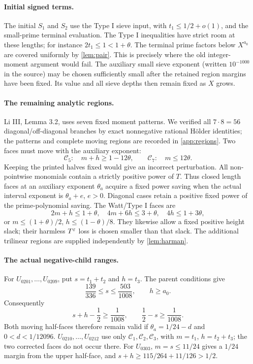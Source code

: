 \paragraph{Initial signed terms.}
The initial $S_1$ and $S_2$ use the Type I sieve input, with
$t_1\le1/2+o(1)$, and the small-prime terminal evaluation.
The Type I inequalities have strict room at these lengths;
for instance $2t_1\le1<1+\theta$.
The terminal prime factors below $X^{a_0}$ are covered uniformly by
\cref{lem:pair}. This is precisely where the old integer-moment
argument would fail. The auxiliary small sieve exponent (written
$10^{-1000}$ in the source) may be chosen sufficiently small after
the retained region margins have been fixed. Its value and all
sieve depths then remain fixed as $X$ grows.

\paragraph{The remaining analytic regions.}
Li III, Lemma 3.2, uses seven fixed moment patterns. We verified all
$7\cdot8=56$ diagonal/off-diagonal branches by exact nonnegative
rational H\"older identities; the patterns and complete moving
regions are recorded in \cref{app:regions}.
Two faces must move with the auxiliary exponent:
\[
 \mathcal C_5:\quad m+h\ge1-12\theta,
 \qquad
 \mathcal C_7:\quad m\le12\theta.
\]
Keeping the printed halves fixed would give an incorrect perturbation.
All non-pointwise monomials contain a strictly positive power of $T$.
Thus closed length faces at an auxiliary exponent $\theta_a$ acquire
a fixed power saving when the actual interval exponent is
$\theta_a+e$, $e>0$. Diagonal cases retain a positive fixed power of
the prime-polynomial saving.
The Watt/Type I faces are
\[
 2m+h\le1+\theta,\quad 4m+6h\le3+\theta,\quad
 4h\le1+3\theta,
\]
or $m\le(1+\theta)/2$, $h\le(1-\theta)/8$.
They likewise allow a fixed positive height slack; their harmless
$T^{\varepsilon}$ loss is chosen smaller than that slack.
The additional trilinear regions are supplied independently by
\cref{lem:harman}.

\paragraph{The actual negative-child ranges.}
For $U_{0201},\ldots,U_{0209}$, put $s=t_1+t_2$ and $h=t_3$.
The parent conditions give
\[
 \frac{139}{336}\le s\le\frac{503}{1008},\qquad h\ge a_0.
\]
Consequently
\begin{equation}\label{eq:halfmargin}
 s+h-\frac12\ge\frac1{1008},\qquad
 \frac12-s\ge\frac1{1008}.
\end{equation}
Both moving half-faces therefore remain valid if
$\theta_a=1/24-d$ and $0<d<1/12096$.
$U_{0210},\ldots,U_{0212}$ use only $\mathcal C_1,\mathcal C_2,
\mathcal C_3$, with $m=t_1$, $h=t_2+t_3$; the two corrected faces
do not occur there.
For $U_{0303}$, $m=s\le11/24$ gives a $1/24$ margin from the
upper half-face, and $s+h\ge115/264+11/126>1/2$.


